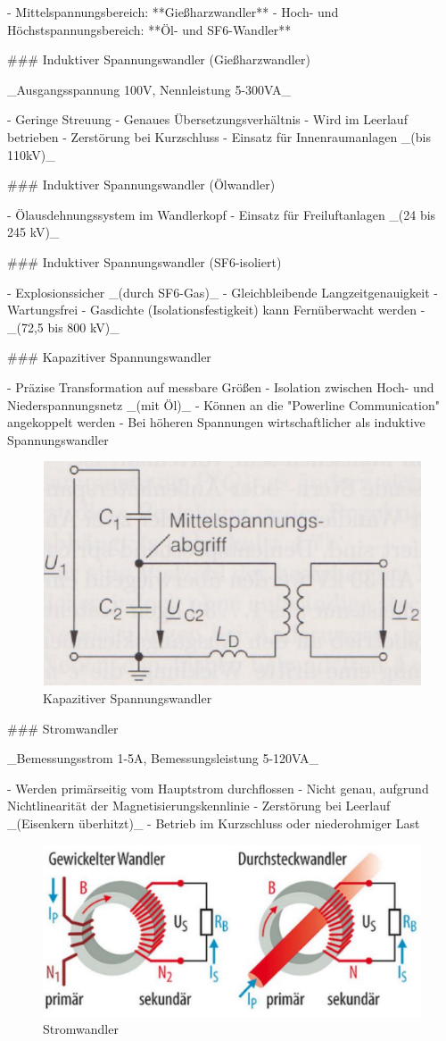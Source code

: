 \begin{markdown}
- Mittelspannungsbereich: **Gießharzwandler**
- Hoch- und Höchstspannungsbereich: **Öl- und SF6-Wandler** 

\newpage

### Induktiver Spannungswandler (Gießharzwandler)

_Ausgangsspannung 100V, Nennleistung 5-300VA_

- Geringe Streuung
- Genaues Übersetzungsverhältnis
- Wird im Leerlauf betrieben
- Zerstörung bei Kurzschluss
- Einsatz für Innenraumanlagen _(bis 110kV)_

### Induktiver Spannungswandler (Ölwandler)

- Ölausdehnungssystem im Wandlerkopf
- Einsatz für Freiluftanlagen _(24 bis 245 kV)_

### Induktiver Spannungswandler (SF6-isoliert)

- Explosionssicher _(durch SF6-Gas)_
- Gleichbleibende Langzeitgenauigkeit
- Wartungsfrei
- Gasdichte (Isolationsfestigkeit) kann Fernüberwacht werden
- _(72,5 bis 800 kV)_

### Kapazitiver Spannungswandler

- Präzise Transformation auf messbare Größen
- Isolation zwischen Hoch- und Niederspannungsnetz _(mit Öl)_
- Können an die "Powerline Communication" angekoppelt werden
- Bei höheren Spannungen wirtschaftlicher als induktive Spannungswandler

\begin{figure}[H]
    \centering
    \includegraphics[width=0.4\linewidth]{./images/10-Schaltanlagen/Spannungswandler-Kapazitiv.png}
    \caption[Kapazitiver Spannungswandler]{Kapazitiver Spannungswandler}
\end{figure}

### Stromwandler

_Bemessungsstrom 1-5A, Bemessungsleistung 5-120VA_

- Werden primärseitig vom Hauptstrom durchflossen
- Nicht genau, aufgrund Nichtlinearität der Magnetisierungskennlinie
- Zerstörung bei Leerlauf _(Eisenkern überhitzt)_
- Betrieb im Kurzschluss oder niederohmiger Last

\begin{figure}[H]
    \centering
    \includegraphics[width=0.6\linewidth]{./images/10-Schaltanlagen/Stromwandler.png}
    \caption[Stromwandler]{Stromwandler}
\end{figure}


\end{markdown}
